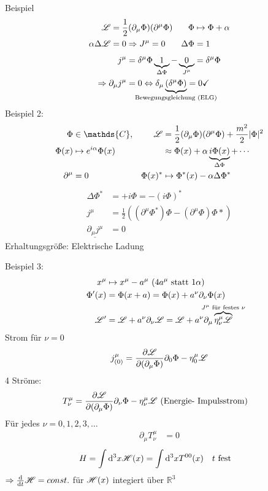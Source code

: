	Beispiel	
		\begin{align*}
			\mathscr{L} &= \frac{1}{2} (\partial_\mu \Phi) (\partial^\mu \Phi) &
			\Phi &\mapsto \Phi + \alpha \\
			\alpha \Delta \mathscr{L} &= 0 \Rightarrow J^\mu = 0 &
			\Delta \Phi &= 1 
		\end{align*}
		\begin{align*}
			j^\mu &= \delta^\mu \Phi \underbrace{1}_{\mathclap{\Delta \Phi}} - 
			\underbrace{0}_{\mathclap{J^\mu}} = \delta^\mu \Phi\\
			\Rightarrow \partial_\mu j^\mu &= 0
			\Leftrightarrow	\delta_\mu \underbrace{(\delta^\mu \Phi)}_{\mathclap{\text{Bewegungsgleichung (ELG)}}} = 0 \checkmark
		\end{align*}
	Beispiel 2:
		\begin{align*}
			\Phi &\in \mathds{C},&
			\La &= \frac{1}{2} (\partial_\mu \Phi)(\partial^\mu \Phi) + \frac{m^2}{2} |\Phi|^2 \\
			\Phi(x) &\mapsto e^{i\alpha} \Phi(x)&  
			&\approx \Phi(x) + \alpha \underbrace{i \Phi(x)}_{\mathclap{\Delta \Phi}} + \cdots \\
			\partial^\mu &= 0 &
			\Phi(x)^* &\mapsto \Phi^* (x) - \alpha \Delta \Phi^* 
		\end{align*}
		\begin{align*}
			\Delta \Phi^* &= + i \Phi = -(i \Phi)^* \\
			j^\mu &= \frac{1}{2} \left(
				(\partial^\mu \Phi^*) \Phi - (\partial^\mu \Phi) \Phi*
			\right) \\
			\underline{\partial_\mu j^\mu} &= 0
		\end{align*}
	Erhaltungsgröße: Elektrische Ladung
	
	Beispiel 3:
		\begin{align*}
			x^\mu &\mapsto x^\mu - a^\mu ~(4a^\mu \text{ statt } 1\alpha) \\
			\Phi' (x) &= \Phi(x + a) = \Phi(x) + a^\nu \partial_\nu \Phi(x) \\
			\La' &= \La + a^\nu \partial_\nu \La = 
			\La + a^\nu \partial_\mu \overbrace{\eta_\nu^\mu \La}^{\mathclap{J^\mu \text{ für festes } \nu}}
		\end{align*}
	Strom für $\nu = 0$
		\begin{align*}
			j_{(0)}^\mu &= \frac{\partial \mathscr{L}}{\partial(\partial_\mu \Phi)} \partial_0 \Phi - \eta_0^\mu \mathscr{L} \\
		\end{align*}
	4 Ströme:
		\begin{align*}
			T^\mu_\nu &= \frac{\partial \mathscr{L}}{\partial(\partial_\mu \Phi)} \partial_\nu \Phi - \eta_\nu^\mu \mathscr{L} \text{ (Energie- Impulsstrom)}
		\end{align*}
	Für jedes $\nu = 0, 1, 2, 3, \ldots$
		\begin{align*}
			\partial_\mu T_\nu^\mu &= 0
		\end{align*}
		\begin{align*}
			H &= \int \mathrm{d}^3 x \mathscr{H} (x) = \int \mathrm{d}^3 x T^{00} (x) & &t\text{ fest}
		\end{align*}
	$\Rightarrow \frac{\mathrm{d}}{\mathrm{d} t} \mathscr{H} = const.$ für $\mathscr{H}(x)$ integiert über $\mathds{R}^3$ 
	

